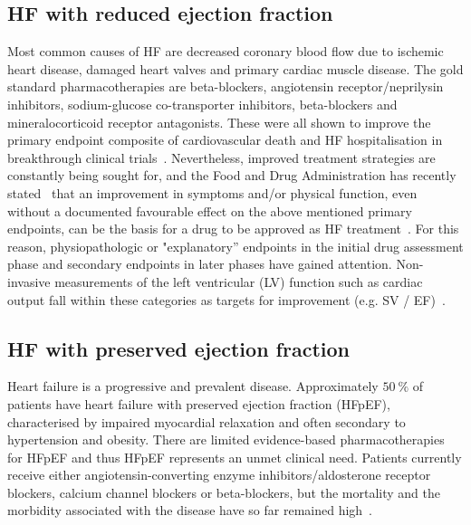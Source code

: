 \subsection{HF with reduced ejection fraction}
Most common causes of HF are decreased coronary blood flow due to ischemic heart disease, damaged heart valves and primary cardiac muscle disease. The gold standard pharmacotherapies are beta-blockers, angiotensin receptor/neprilysin inhibitors, sodium-glucose co-transporter inhibitors, beta-blockers and mineralocorticoid receptor antagonists. These were all shown to improve the primary endpoint composite of cardiovascular death and HF hospitalisation in breakthrough clinical trials~\cite{Debska-Kozlowska:2021}. Nevertheless, improved treatment strategies are constantly being sought for, and the Food and Drug Administration has recently stated~\cite{FDA:2019} that an improvement in symptoms and/or physical function, even without a documented favourable effect on the above mentioned primary endpoints, can be the basis for a drug to be approved as HF treatment~\cite{Fiuzat:2020}. For this reason, physiopathologic or "explanatory'' endpoints in the initial drug assessment phase and secondary endpoints in later phases have gained attention. Non-invasive measurements of the left ventricular (LV) function such as cardiac output fall within these categories as targets for improvement (e.g. SV / EF)~\cite{Zanolla:2003}.


%
%
%
\subsection{HF with preserved ejection fraction}
Heart failure is a progressive and prevalent disease. Approximately $\SI{50}{\percent}$ of patients have heart failure with preserved ejection fraction (HFpEF), characterised by impaired myocardial relaxation and often secondary to hypertension and obesity. There are limited evidence-based pharmacotherapies for HFpEF and thus HFpEF represents an unmet clinical need. Patients currently receive either angiotensin-converting enzyme inhibitors/aldosterone receptor blockers, calcium channel blockers or beta-blockers, but the mortality and the morbidity associated with the disease have so far remained high~\cite{Adamczak:2020}.


